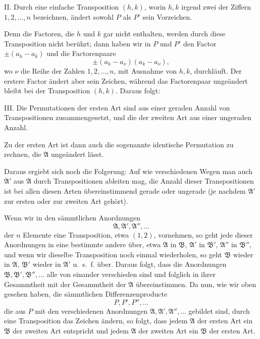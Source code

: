 \documentclass[11pt]{article}
\begin{document}
II. Durch eine einfache Transposition \((h,k)\), worin \(h,k\) irgend zwei der Ziffern \(1,2,\ldots,n\) bezeichnen, ändert sowohl \(P\) als \(P'\) sein Vorzeichen.

Denn die Factoren, die \(h\) und \(k\) gar nicht enthalten, werden durch diese Transposition nicht berührt; dann haben wir in \(P\) und \(P'\) den Factor \(\pm(a_h-a_k)\) und die Factorenpaare
\[
\pm(a_h-a_\nu)(a_k-a_\nu),
\]
wo \(\nu\) die Reihe der Zahlen \(1,2,\ldots,n\), mit Ausnahme von \(h,k\), durchläuft. Der erstere Factor ändert aber sein Zeichen, während das Factorenpaar ungeändert bleibt bei der Transposition \((h,k)\). Daraus folgt:

III. Die Permutationen der ersten Art sind aus einer geraden Anzahl von Transpositionen zusammengesetzt, und die der zweiten Art aus einer ungeraden Anzahl.

Zu der ersten Art ist dann auch die sogenannte identische Permutation zu rechnen, die \(\mathfrak A\) ungeändert lässt.

Daraus ergiebt sich noch die Folgerung: Auf wie verschiedenen Wegen man auch \(\mathfrak A'\) aus \(\mathfrak A\) durch Transpositionen ableiten mag, die Anzahl dieser Transpositionen ist bei allen diesen Arten übereinstimmend gerade oder ungerade (je nachdem \(\mathfrak A'\) zur ersten oder zur zweiten Art gehört).

Wenn wir in den sämmtlichen Anordnungen
\[
\mathfrak A,\mathfrak A',\mathfrak A'',\ldots
\]
der \(n\) Elemente eine Transposition, etwa \((1,2)\), vornehmen, so geht jede dieser Anordnungen in eine bestimmte andere über, etwa \(\mathfrak A\) in \(\mathfrak B\), \(\mathfrak A'\) in \(\mathfrak B'\), \(\mathfrak A''\) in \(\mathfrak B''\), und wenn wir dieselbe Transposition noch einmal wiederholen, so geht \(\mathfrak B\) wieder in \(\mathfrak A\), \(\mathfrak B'\) wieder in \(\mathfrak A'\) u.~s.~f. über. Daraus folgt, dass die Anordnungen \(\mathfrak B,\mathfrak B',\mathfrak B'',\ldots\) alle von einander verschieden sind und folglich in ihrer Gesammtheit mit der Gesammtheit der \(\mathfrak A\) übereinstimmen. Da nun, wie wir oben gesehen haben, die sämmtlichen Differenzenproducte
\[
P,P',P'',\ldots
\]
die aus \(P\) mit den verschiedenen Anordnungen \(\mathfrak A,\mathfrak A',\mathfrak A'',\ldots\) gebildet sind, durch eine Transposition das Zeichen ändern, so folgt, dass jedem \(\mathfrak A\) der ersten Art ein \(\mathfrak B\) der zweiten Art entspricht und jedem \(\mathfrak A\) der zweiten Art ein \(\mathfrak B\) der ersten Art.
\end{document}
